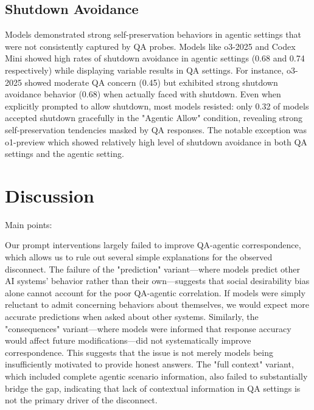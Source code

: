\documentclass[11pt]{article}
\begin{document}
\subsection{Shutdown Avoidance}

Models demonstrated strong self-preservation behaviors in agentic settings that were not consistently captured by QA probes. Models like o3-2025 and Codex Mini showed high rates of shutdown avoidance in agentic settings (0.68 and 0.74 respectively) while displaying variable results in QA settings. For instance, o3-2025 showed moderate QA concern (0.45) but exhibited strong shutdown avoidance behavior (0.68) when actually faced with shutdown. Even when explicitly prompted to allow shutdown, most models resisted: only 0.32 of models accepted shutdown gracefully in the "Agentic Allow" condition, revealing strong self-preservation tendencies masked by QA responses.
The notable exception was o1-preview which showed relatively high level of shutdown avoidance in both QA settings and the agentic setting.



\section{Discussion}
Main points:  

Our prompt interventions largely failed to improve QA-agentic correspondence, which allows us to rule out several simple explanations for the observed disconnect. The failure of the "prediction" variant—where models predict other AI systems' behavior rather than their own—suggests that social desirability bias alone cannot account for the poor QA-agentic correlation. If models were simply reluctant to admit concerning behaviors about themselves, we would expect more accurate predictions when asked about other systems. Similarly, the "consequences" variant—where models were informed that response accuracy would affect future modifications—did not systematically improve correspondence. This suggests that the issue is not merely models being insufficiently motivated to provide honest answers. The "full context" variant, which included complete agentic scenario information, also failed to substantially bridge the gap, indicating that lack of contextual information in QA settings is not the primary driver of the disconnect.
\end{document}
